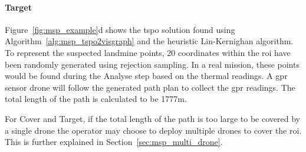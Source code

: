 \paragraph{Target} Figure~\ref{fig:msp_example}d shows the \gls{tspo} solution found using Algorithm~\ref{alg:msp_tspo2visgraph} and the heuristic Lin-Kernighan algorithm. To represent the suspected landmine points, 20 coordinates within the \gls{roi} have been randomly generated using rejection sampling. In a real mission, these points would be found during the Analyse step based on the thermal readings. A \gls{gpr} sensor drone will follow the generated path plan to collect the \gls{gpr} readings. The total length of the path is calculated to be 1777m.

For Cover and Target, if the total length of the path is too large to be covered by a single drone the operator may choose to deploy multiple drones to cover the \gls{roi}. This is further explained in Section~\ref{sec:msp_multi_drone}. 

